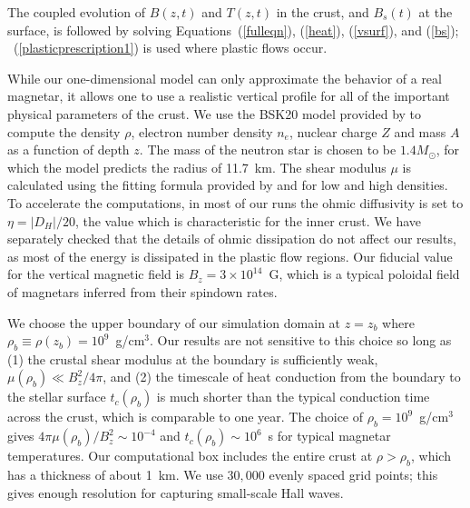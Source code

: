 The coupled evolution of $B(z,t)$ and $T(z,t)$ in the crust, and $B_s(t)$ at the surface, is followed by solving Equations~(\ref{fulleqn}), (\ref{heat}), (\ref{vsurf}), and (\ref{bs}); \Eq~(\ref{plasticprescription1}) is used where plastic flows occur.

While our one-dimensional model can only approximate the behavior of a real magnetar, it allows one to use a realistic vertical profile for all of the important physical parameters of the crust.
We use the BSK20 model provided by \citet{2013A&A...560A..48P} to compute the density $\rho$, electron number density $n_e$, nuclear charge $Z$ and mass $A$ as a function of depth $z$. 
The mass  of the neutron star is chosen to be $1.4M_{\odot}$, for which the model predicts the radius of  11.7~km.
The shear modulus $\mu$ is calculated using the fitting formula provided by \citet{2005ApJ...634L.153P} and \citet{2007MNRAS.375..261S} for low and high densities. 
To accelerate the computations, in most of our runs the ohmic diffusivity  is set to $\eta = |D_H|/20$, the value which is characteristic for the inner crust. We have separately checked that the details of ohmic dissipation do not affect our results, as most of the energy is dissipated in the plastic flow regions.  
Our fiducial value for the vertical magnetic field is $B_z = 3\times 10^{14}$~G, which is a typical poloidal field of magnetars inferred from their spindown rates.

We choose the upper boundary of our simulation domain at $z=z_b$ where $\rho_b\equiv\rho(z_b)=10^{9}$~g/cm$^3$. 
Our results are not sensitive to this choice so long as 
(1) the crustal shear modulus at the boundary is sufficiently weak, $\mu(\rho_b)\ll B_z^2/4\pi$, and (2) the timescale of heat conduction from the boundary to the stellar surface $t_c(\rho_b)$ is much shorter than the typical conduction time across the crust, which is comparable to one year. 
The choice of $\rho_b=10^9$~g/cm$^3$ gives $4\pi\mu(\rho_b)/B_z^2\sim 10^{-4}$ and $t_c(\rho_b)\sim 10^6$~s for typical magnetar temperatures. 
Our computational box includes the entire crust at $\rho>\rho_b$, which has a
thickness of about 1~km. 
We use $30,000$ evenly spaced grid points; this gives enough resolution for capturing small-scale Hall waves.

